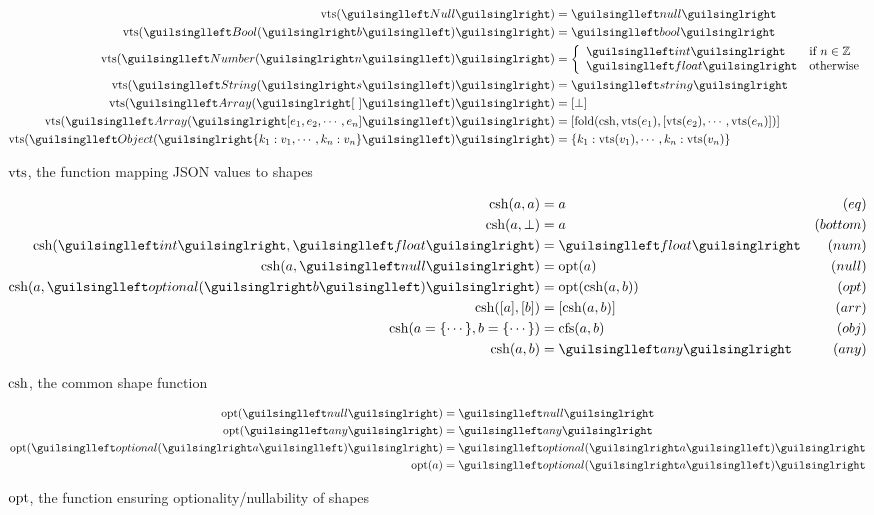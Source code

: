 \begin{figure}[ht!]
\begin{align*}
\shap(‹Null›)          &= ‹null› \\
\shap(‹Bool(›b‹)›)     &= ‹bool› \\
\shap(‹Number(›n‹)›)   &= \left\{\begin{array}{ll}
  ‹int›   & \text{if } n \in \mathbb{Z} \\
  ‹float› & \text{otherwise}
\end{array}\right.\\
\shap(‹String(›s‹)›)   &= ‹string› \\
\shap(‹Array(›[\ ]‹)›) &= [\bot] \\
\shap(‹Array(›[e_1, e_2, \cdots, e_n]‹)›) &= [\fold(\csh, \shap(e_1), [\shap(e_2), \cdots, \shap(e_n)])] \\
\shap(‹Object(›\{ k_1 : v_1, \cdots, k_n : v_n \}‹)›) &= \{ k_1 : \shap(v_1), \cdots, k_n : \shap(v_n) \}
\end{align*}
\caption{$\operatorname{vts}$, the function mapping JSON values to shapes}
\label{fig:shap}
\end{figure}

\begin{figure}[ht!]
\begin{align*}
\csh(a, a)               &=  a               & (eq) \\
\csh(a, \bot)            &=  a               & (bottom) \\
\csh(‹int›, ‹float›)     &= ‹float›          & (num) \\
\csh(a, ‹null›)          &= \opt(a)          & (null) \\
\csh(a, ‹optional(›b‹)›) &= \opt(\csh(a, b)) & (opt) \\
\csh([a], [b])           &= [\csh(a, b)]     & (arr) \\
\csh(a = \{ \cdots \}, b = \{ \cdots \}) &= \cfs(a, b) & (obj) \\
\csh(a, b)               &= ‹any›            & (any)
\end{align*}
\caption{$\operatorname{csh}$, the common shape function}
\label{fig:csh}
\end{figure}

\begin{figure}[ht!]
\begin{align*}
\opt(‹null›) &= ‹null› \\
\opt(‹any›)  &= ‹any› \\
\opt(‹optional(›a‹)›) &= ‹optional(›a‹)› \\
\opt(a) &= ‹optional(›a‹)›
\end{align*}
\caption{$\operatorname{opt}$, the function ensuring optionality/nullability of shapes}
\label{fig:opt}
\end{figure}


